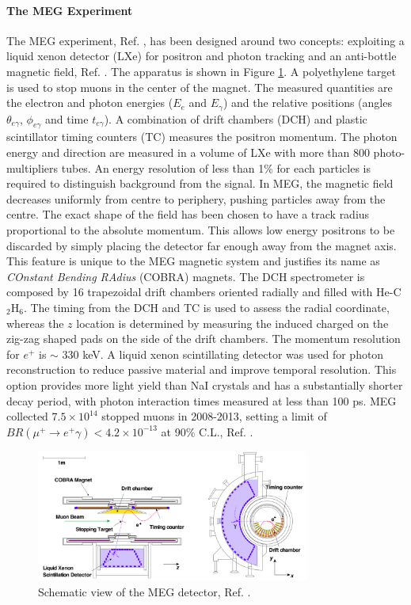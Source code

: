 \paragraph{The MEG Experiment}
The MEG experiment, Ref. \cite{megi}, has been designed around two concepts: exploiting a liquid
xenon detector (LXe) for positron and photon tracking and an anti-bottle magnetic field, Ref. \cite{clfv_signorelli}. 
The apparatus is shown in Figure \ref{fig:meg}. A polyethylene target is used to stop muons in the center of the magnet. 
The measured quantities are the electron and photon energies ($E_e$ and $E_\gamma$) and the
relative positions (angles $\theta_{e\gamma}$, $\phi_{e\gamma}$ and time $t_{e \gamma}$).
A combination of drift chambers (DCH) and plastic scintillator timing counters (TC) measures the positron momentum.
The photon energy and direction are measured in a volume of LXe with more than 800 photo-multipliers tubes. 
An energy resolution of less than 1\% for each particles is required to distinguish background from the signal. 
In MEG, the magnetic field decreases uniformly from centre to periphery, pushing particles away from the centre. 
The exact shape of the field has been chosen to have a track radius proportional to the absolute momentum.
This allows low energy positrons to be discarded by simply placing the detector far enough away from the magnet axis. 
This feature is unique to the MEG magnetic system and justifies its name as \textit{COnstant Bending RAdius} (COBRA) magnets.
The DCH spectrometer is composed by 16 trapezoidal drift chambers oriented radially and filled with He-C$_2$H$_6$. 
The timing from the DCH and TC is used to assess the radial coordinate, whereas the $z$ location is determined by measuring the induced
charged on the zig-zag shaped pads on the side of the drift chambers. The momentum resolution for $e^+$ is $\sim$ 330 keV.
A liquid xenon scintillating detector was used for photon reconstruction to reduce passive material and improve temporal resolution. 
This option provides more light yield than NaI crystals and has a substantially shorter decay period, with photon interaction times measured at less than 100 ps.
MEG collected $7.5 \times 10^{14}$ stopped muons in 2008-2013, setting a limit of $BR(\mu^+ \rightarrow e^+ \gamma) < 4.2 \times 10^{-13}$ at 90\% C.L., Ref. \cite{megi}.
\begin{figure}[!h]
\centering
\includegraphics[width =0.8\textwidth]{figures/png/Screenshot_20240321_115127.png}
\caption{Schematic view of the MEG detector, Ref. \cite{megi}.}
\label{fig:meg}
\end{figure}
